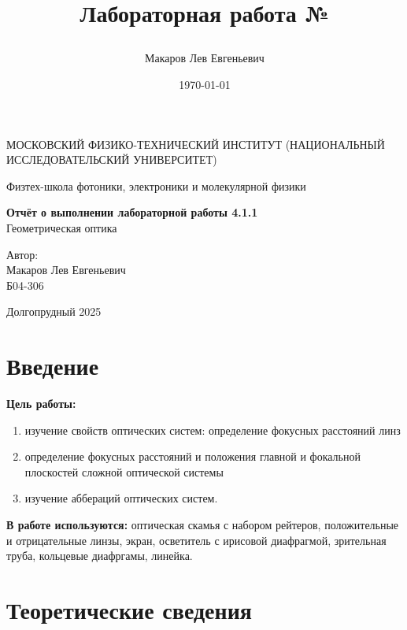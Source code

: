 \documentclass[a4paper,12pt]{article}
\author{Макаров Лев Евгеньевич}
\title{Лабораторная работа №\labnumber

\labname
}
\date{\today}
\newcommand\labname{Геометрическая оптика}
\newcommand\labnumber{4.1.1}
\begin{document}
\begin{titlepage}
	\begin{center}
		{\large МОСКОВСКИЙ ФИЗИКО-ТЕХНИЧЕСКИЙ ИНСТИТУТ (НАЦИОНАЛЬНЫЙ ИССЛЕДОВАТЕЛЬСКИЙ УНИВЕРСИТЕТ)}
	\end{center}
	\begin{center}
		{\large Физтех-школа фотоники, электроники и молекулярной физики}
	\end{center}
	
	
	\vspace{4.5cm}
	{\huge
		\begin{center}
			{\bf Отчёт о выполнении лабораторной работы \labnumber}\\
			\labname
		\end{center}
	}
	\vspace{2cm}
	\begin{flushright}
		{\LARGE Автор:\\ Макаров Лев Евгеньевич \\
			\vspace{0.2cm}
			Б04-306}
	\end{flushright}
	\vspace{8cm}
	\begin{center}
		Долгопрудный 2025
	\end{center}
\end{titlepage}

\section{Введение}

\textbf{Цель работы:} 
\begin{enumerate}
	\item изучение свойств оптических систем: определение фокусных расстояний линз
    \item определение фокусных расстояний и положения главной и фокальной плоскостей сложной оптической системы
    \item изучение аббераций оптических систем.
\end{enumerate}

\textbf{В работе используются:} оптическая скамья с набором рейтеров, положительные и отрицательные линзы, экран, осветитель с ирисовой диафрагмой, зрительная труба, кольцевые диафргамы, линейка.


\section{Теоретические сведения}
\end{document}

